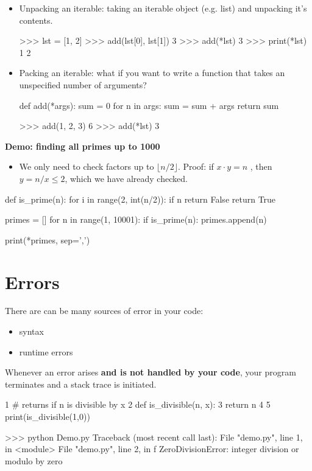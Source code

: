 \documentclass[12pt]{article}
\numberwithin{equation}{section}
\begin{document}
\begin{itemize}
    \item Unpacking an iterable: taking an iterable object (e.g. list) and unpacking it's contents.
    \begin{python}
    >>> lst = [1, 2]
    >>> add(lst[0], lst[1])
    3
    >>> add(*lst)
    3
    >>> print(*lst)
    1 2
    \end{python}
    \item Packing an iterable: what if you want to write a function that takes an unspecified number of arguments?
    \begin{python}
    def add(*args):
        sum = 0
        for n in args:
            sum = sum + args
        return sum
    
    >>> add(1, 2, 3)
    6
    >>> add(*lst)
    3
    \end{python}
\end{itemize}

\textbf{Demo: finding all primes up to 1000}
\begin{itemize}
    \item We only need to check factors up to $\lfloor n/2 \rfloor$. Proof: if $x\cdot y = n$ , then $y = n/x \leq 2$, which we have already checked.
\end{itemize}

\begin{python}
def is_prime(n):
    for i in range(2, int(n/2)):
        if n%
            return False
    return True

primes = []
for n in range(1, 10001):
    if is_prime(n):
        primes.append(n)

print(*primes, sep=',')
\end{python}

\section{Errors}
There are can be many sources of error in your code:
\begin{itemize}
    \item syntax
    \item runtime errors
\end{itemize}
Whenever an error arises \textbf{and is not handled by your code}, your program terminates and a stack trace is initiated.

\begin{python}
1 # returns if n is divisible by x
2 def is_divisible(n, x):
3 	return n%
4 
5 print(is_divisible(1,0))

>>> python Demo.py
Traceback (most recent call last):
  File "demo.py", line 1, in <module>
  File "demo.py", line 2, in f
ZeroDivisionError: integer division or modulo by zero
\end{python}
\end{document}
